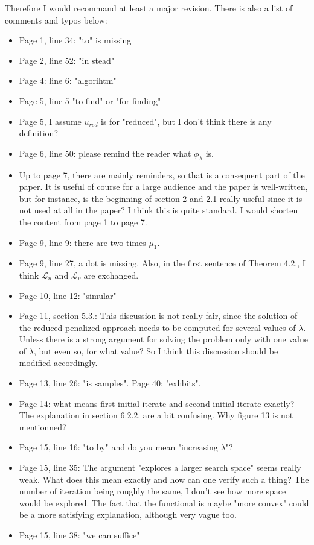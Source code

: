\documentclass[12pt]{article}
\begin{document}
Therefore I would recommand at least a major revision. There is also a list of comments and typos below: 
\begin{itemize} 
\item Page 1, line 34: "to" is missing 
\item Page 2, line 52: "in stead" 
\item Page 4: line 6: "algorihtm" 
\item Page 5, line 5 "to find" or "for finding" 
\item Page 5, I assume $u_{red}$ is for "reduced", but I don't think there is any definition? 
\item Page 6, line 50: please remind the reader what $\phi_\lambda$ is. 
\item Up to page 7, there are mainly reminders, so that is a consequent part of the paper. It is useful of course for a large audience and the paper is well-written, but for instance, is the beginning of section 2 and 2.1 really useful since it is not used at all in the paper? I think this is quite standard. I would shorten the content from page 1 to page 7. 
\item Page 9, line 9: there are two times $\mu_1$. 
\item Page 9, line 27, a dot is missing. Also, in the first sentence of Theorem 4.2., I think $\mathcal L_u$ and $\mathcal L_v$ are exchanged. 
\item Page 10, line 12: "simular" 
\item Page 11, section 5.3.: This discussion is not really fair, since the solution of the reduced-penalized approach needs to be computed for several values of $\lambda$. Unless there is a strong argument for solving the problem only with one value of $\lambda$, but even so, for what value? So I think this discussion should be modified accordingly. 
\item Page 13, line 26: "is samples". Page 40: "exhbits". 
\item Page 14: what means first initial iterate and second initial iterate exactly? The explanation in section 6.2.2. are a bit confusing. Why figure 13 is not mentionned? 
\item Page 15, line 16: "to by" and do you mean "increasing $\lambda$"? 
\item Page 15, line 35: The argument "explores a larger search space" seems really weak. What does this mean exactly and how can one verify such a thing? The number of iteration being roughly the same, I don't see how more space would be explored. The fact that the functional is maybe "more convex" could be a more satisfying explanation, although very vague too. 
\item Page 15, line 38: "we can suffice" 
\end{itemize} 
\end{document}
